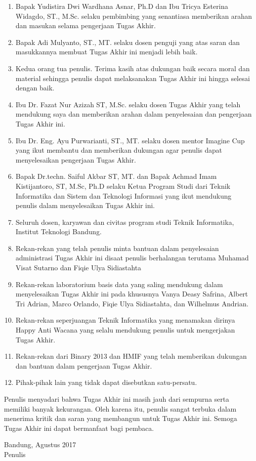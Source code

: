 \begin{enumerate}
	\item Bapak Yudistira Dwi Wardhana Asnar, Ph.D dan Ibu Tricya Esterina Widagdo, ST., M.Sc. selaku pembimbing yang senantiasa memberikan arahan dan masukan selama pengerjaan Tugas Akhir.
	\item Bapak Adi Mulyanto, ST., MT. selaku dosen penguji yang atas saran dan masukkannya membuat Tugas Akhir ini menjadi lebih baik.
	\item Kedua orang tua penulis. Terima kasih atas dukungan baik secara moral dan material sehingga penulis dapat melaksanakan Tugas Akhir ini hingga selesai dengan baik.
	\item Ibu Dr. Fazat Nur Azizah ST, M.Sc. selaku dosen Tugas Akhir yang telah mendukung saya dan memberikan arahan dalam penyelesaian dan pengerjaan Tugas Akhir ini.
	\item Ibu Dr. Eng. Ayu Purwarianti, ST., MT. selaku dosen mentor Imagine Cup yang ikut membantu dan memberikan dukungan agar penulis dapat menyelesaikan pengerjaan Tugas Akhir.
	\item Bapak Dr.techn. Saiful Akbar ST, MT. dan Bapak Achmad Imam Kistijantoro, ST, M.Sc, Ph.D selaku Ketua Program Studi dari Teknik Informatika dan Sistem dan Teknologi Informasi yang ikut mendukung penulis dalam menyelesaikan Tugas Akhir ini.
	\item Seluruh dosen, karyawan dan civitas program studi Teknik Informatika, Institut Teknologi Bandung.
	\item Rekan-rekan yang telah penulis minta bantuan dalam penyelesaian administrasi Tugas Akhir ini disaat penulis berhalangan terutama Muhamad Visat Sutarno dan Fiqie Ulya Sidiastahta
	\item Rekan-rekan laboratorium basis data yang saling mendukung dalam menyelesaikan Tugas Akhir ini pada khususnya Vanya Deasy Safrina, Albert Tri Adrian, Marco Orlando, Fiqie Ulya Sidiastahta, dan Wilhelmus Andrian.
	\item Rekan-rekan seperjuangan Teknik Informatika yang menamakan dirinya Happy Anti Wacana yang selalu mendukung penulis untuk mengerjakan Tugas Akhir.
	\item Rekan-rekan dari Binary 2013 dan HMIF yang telah memberikan dukungan dan bantuan dalam pengerjaan Tugas Akhir.
	\item Pihak-pihak lain yang tidak dapat disebutkan satu-persatu.
\end{enumerate}

Penulis menyadari bahwa Tugas Akhir ini masih jauh dari sempurna serta memiliki banyak kekurangan. Oleh karena itu, penulis sangat terbuka dalam menerima kritik dan saran yang membangun untuk Tugas Akhir ini. Semoga Tugas Akhir ini dapat bermanfaat bagi pembaca.

\begin{flushright}
Bandung, Agustus 2017 \\
\vspace{25mm}
Penulis
\end{flushright}
